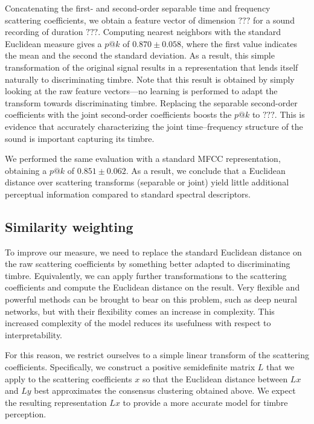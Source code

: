 \documentclass{bmcart}
\makeatletter
\newcommand{\patk}{p\mathrm{@}k}
\makeatother
\begin{document}
Concatenating the first- and second-order separable time and frequency scattering coefficients, we obtain a feature vector of dimension $???$ for a sound recording of duration $???$.
Computing nearest neighbors with the standard Euclidean measure gives a $\patk$ of $0.870 \pm 0.058$, where the first value indicates the mean and the second the standard deviation.
As a result, this simple transformation of the original signal results in a representation that lends itself naturally to discriminating timbre.
Note that this result is obtained by simply looking at the raw feature vectors---no learning is performed to adapt the transform towards discriminating timbre.
Replacing the separable second-order coefficients with the joint second-order coefficients boosts the $\patk$ to $???$.
This is evidence that accurately characterizing the joint time--frequency structure of the sound is important capturing its timbre.

We performed the same evaluation with a standard MFCC representation, obtaining a $\patk$ of $0.851 \pm 0.062$.
As a result, we conclude that a Euclidean distance over scattering transforms (separable or joint) yield little additional perceptual information compared to standard spectral descriptors.

\subsection*{Similarity weighting}
\label{sec:weighting}

To improve our measure, we need to replace the standard Euclidean distance on the raw scattering coefficients by something better adapted to discriminating timbre.
Equivalently, we can apply further transformations to the scattering coefficients and compute the Euclidean distance on the result.
Very flexible and powerful methods can be brought to bear on this problem, such as deep neural networks, but with their flexibility comes an increase in complexity.
This increased complexity of the model reduces its usefulness with respect to interpretability.

For this reason, we restrict ourselves to a simple linear transform of the scattering coefficients.
Specifically, we construct a positive semidefinite matrix $L$ that we apply to the scattering coefficients $x$ so that the Euclidean distance between $Lx$ and $Ly$ best approximates the consensus clustering obtained above.
We expect the resulting representation $Lx$ to provide a more accurate model for timbre perception.
\end{document}

